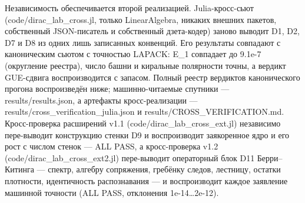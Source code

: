 \documentclass[11pt,a4paper]{article}
\begin{document}
Независимость обеспечивается второй реализацией. Julia-кросс-сьют (code/dirac\_\allowbreak{}lab\_\allowbreak{}cross.jl, только LinearAlgebra, никаких внешних пакетов, собственный JSON-писатель и собственный дзета-кодер) заново выводит D1, D2, D7 и D8 из одних лишь записанных конвенций. Его результаты совпадают с каноническим сьютом с точностью LAPACK: E\_\allowbreak{}1 совпадает до 9.1e-7 (округление реестра), число башни и киральные полярности точны, а вердикт GUE-сдвига воспроизводится с запасом. Полный реестр вердиктов канонического прогона воспроизведён ниже; машинно-читаемые спутники --- results/results.json, а артефакты кросс-реализации --- results/cross\_\allowbreak{}verification\_\allowbreak{}julia.json и results/CROSS\_\allowbreak{}VERIFICATION.md. Кросс-проверка расширений v1.1 (code/dirac\_\allowbreak{}lab\_\allowbreak{}cross\_\allowbreak{}ext.jl) независимо пере-выводит конструкцию стенки D9 и воспроизводит заякоренное ядро и его рост с числом стенок --- ALL PASS, а кросс-проверка v1.2 (code/dirac\_\allowbreak{}lab\_\allowbreak{}cross\_\allowbreak{}ext2.jl) пере-выводит операторный блок D11 Берри--Китинга --- спектр, алгебру сопряжения, гребёнку следов, лестницу, остатки плотности, идентичность распознавания --- и воспроизводит каждое заявление машинной точности (ALL PASS, отклонения 1e-14\ldots2e-12).
\end{document}

